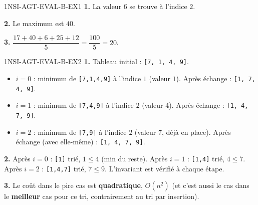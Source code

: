 \begin{corrige}{1NSI-AGT-EVAL-B-EX1}
\textbf{1.} La valeur $6$ se trouve à l'indice $2$.

\textbf{2.} Le maximum est $40$.

\textbf{3.} $\dfrac{17+40+6+25+12}{5}=\dfrac{100}{5}=20$.
\end{corrige}

\begin{corrige}{1NSI-AGT-EVAL-B-EX2}
\textbf{1.} Tableau initial : \lstinline{[7, 1, 4, 9]}.
\begin{itemize}
  \item $i=0$ : minimum de \lstinline{[7,1,4,9]} à l'indice $1$ (valeur $1$). Après échange : \lstinline{[1, 7, 4, 9]}.
  \item $i=1$ : minimum de \lstinline{[7,4,9]} à l'indice $2$ (valeur $4$). Après échange : \lstinline{[1, 4, 7, 9]}.
  \item $i=2$ : minimum de \lstinline{[7,9]} à l'indice $2$ (valeur $7$, déjà en place). Après échange (avec elle-même) : \lstinline{[1, 4, 7, 9]}.
\end{itemize}

\textbf{2.} Après $i=0$ : \lstinline{[1]} trié, $1\leqslant4$ (min du reste). Après $i=1$ :
\lstinline{[1,4]} trié, $4\leqslant7$. Après $i=2$ : \lstinline{[1,4,7]} trié,
$7\leqslant9$. L'invariant est vérifié à chaque étape.

\textbf{3.} Le coût dans le pire cas est \textbf{quadratique}, $O(n^2)$ (et c'est aussi
le cas dans le \textbf{meilleur} cas pour ce tri, contrairement au tri par insertion).
\end{corrige}
